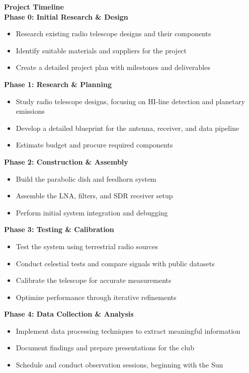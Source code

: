 \documentclass[12pt]{report}
\begin{document}
    \begin{flushleft}
    {\Large \textbf{Project Timeline}}\\[1em]
    \textbf{Phase 0: Initial Research \& Design}
    \begin{itemize}[leftmargin=1.5em]
        \item Research existing radio telescope designs and their components
        \item Identify suitable materials and suppliers for the project
        \item Create a detailed project plan with milestones and deliverables
    \end{itemize}
    \textbf{Phase 1: Research \& Planning}
    \begin{itemize}[leftmargin=1.5em]
        \item Study radio telescope designs, focusing on HI-line detection and planetary emissions
        \item Develop a detailed blueprint for the antenna, receiver, and data pipeline
        \item Estimate budget and procure required components
    \end{itemize}

    \textbf{Phase 2: Construction \& Assembly}
    \begin{itemize}[leftmargin=1.5em]
        \item Build the parabolic dish and feedhorn system
        \item Assemble the LNA, filters, and SDR receiver setup
        \item Perform initial system integration and debugging
    \end{itemize}

    \textbf{Phase 3: Testing \& Calibration}
    \begin{itemize}[leftmargin=1.5em]
        \item Test the system using terrestrial radio sources
        \item Conduct celestial tests and compare signals with public datasets
        \item Calibrate the telescope for accurate measurements
        \item Optimize performance through iterative refinements
    \end{itemize}

    \textbf{Phase 4: Data Collection \& Analysis}
    \begin{itemize}[leftmargin=1.5em]
        \item Implement data processing techniques to extract meaningful information
        \item Document findings and prepare presentations for the club
        \item Schedule and conduct observation sessions, beginning with the Sun
    \end{itemize}



\end{flushleft}
\end{document}

